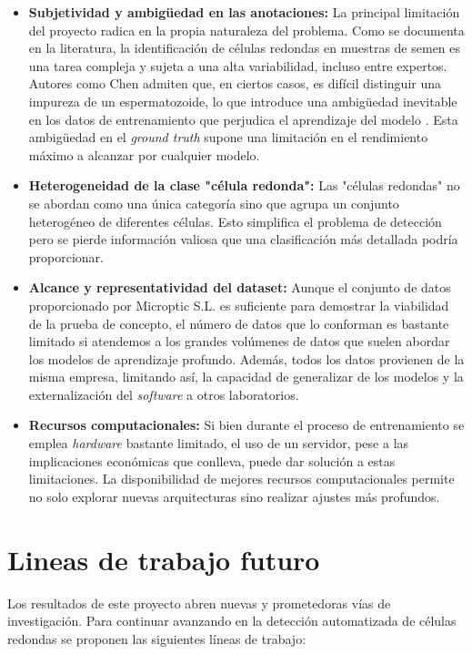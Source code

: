 \documentclass[12pt,a4paper,onecolumn,oneside]{report}
\begin{document}
\begin{itemize}
  \item \textbf{Subjetividad y ambigüedad en las anotaciones:} La principal limitación del proyecto radica en la propia naturaleza del problema. Como se documenta en la literatura, 
  la identificación de células redondas en muestras de semen es una tarea compleja y sujeta a una alta variabilidad, incluso entre expertos. Autores como Chen admiten que,
  en ciertos casos, es difícil distinguir una impureza de un espermatozoide, lo que introduce una ambigüedad inevitable en los datos de entrenamiento que perjudica el aprendizaje del modelo \cite{chen2024}.
  Esta ambigüedad en el \textit{ground truth} supone una limitación en el rendimiento máximo a alcanzar por cualquier modelo.
  \item \textbf{Heterogeneidad de la clase "célula redonda":} Las "células redondas" no se abordan como una única categoría sino que agrupa un conjunto heterogéneo de diferentes células. Esto simplifica el problema de detección pero se pierde información valiosa 
  que una clasificación más detallada podría proporcionar.
  \item \textbf{Alcance y representatividad del dataset:} Aunque el conjunto de datos proporcionado por Microptic S.L. \cite{microptic} es suficiente para demostrar la viabilidad de la prueba de concepto, 
  el número de datos que lo conforman es bastante limitado si atendemos a los grandes volúmenes de datos que suelen abordar los modelos de aprendizaje profundo. Además, todos los datos provienen de la misma empresa, limitando así, la capacidad de generalizar de los modelos
  y la externalización del \textit{software} a otros laboratorios.
  \item \textbf{Recursos computacionales:} Si bien durante el proceso de entrenamiento se emplea \textit{hardware} bastante limitado, el uso de un servidor, pese a las implicaciones económicas que conlleva, puede dar solución a estas limitaciones.
  La disponibilidad de mejores recursos computacionales permite no solo explorar nuevas arquitecturas sino realizar ajustes más profundos.
\end{itemize}

\section{Lineas de trabajo futuro}
\label{sec:Lineas de trabajo futuro}

Los resultados de este proyecto abren nuevas y prometedoras vías de investigación. Para continuar avanzando en la detección automatizada de células redondas se proponen las siguientes líneas de trabajo:
\end{document}

